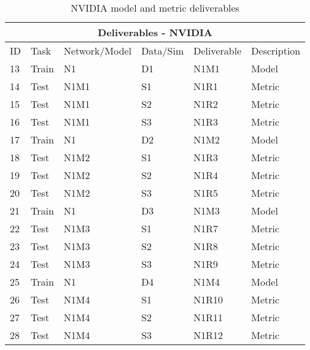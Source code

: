 


\begin{table}[]
\begin{center}
\begin{tabular}{|l|l|l|l|l|l|}
\hline
\multicolumn{6}{|c|}{Deliverables - NVIDIA} \\ \hline

ID & Task &  Network/Model & Data/Sim & Deliverable & Description \\ \hline\hline
13 & Train & N1 & D1 & N1M1 & Model \\ \hline
14 & Test & N1M1 & S1 & N1R1 & Metric \\ \hline
15 & Test & N1M1 & S2 & N1R2 & Metric \\ \hline
16 & Test & N1M1 & S3 & N1R3 & Metric \\ \hline\hline

17 & Train & N1 & D2 & N1M2 & Model \\ \hline
18 & Test & N1M2 & S1 & N1R3 & Metric \\ \hline
19 & Test & N1M2 & S2 & N1R4 & Metric \\ \hline
20 & Test & N1M2 & S3 & N1R5 & Metric \\ \hline\hline

21 & Train & N1 & D3 & N1M3 & Model \\ \hline
22 & Test & N1M3 & S1 & N1R7 & Metric \\ \hline
23 & Test & N1M3 & S2 & N1R8 & Metric \\ \hline
24 & Test & N1M3 & S3 & N1R9 & Metric \\ \hline\hline

25 & Train & N1 & D4 & N1M4 & Model \\ \hline
26 & Test & N1M4 & S1 & N1R10 & Metric \\ \hline
27 & Test & N1M4 & S2 & N1R11 & Metric \\ \hline
28 & Test & N1M4 & S3 & N1R12 & Metric \\ \hline 

\end{tabular}
\end{center}
\caption{NVIDIA model and metric deliverables}
\label{Deliverables-NVIDIA}
\end{table}



